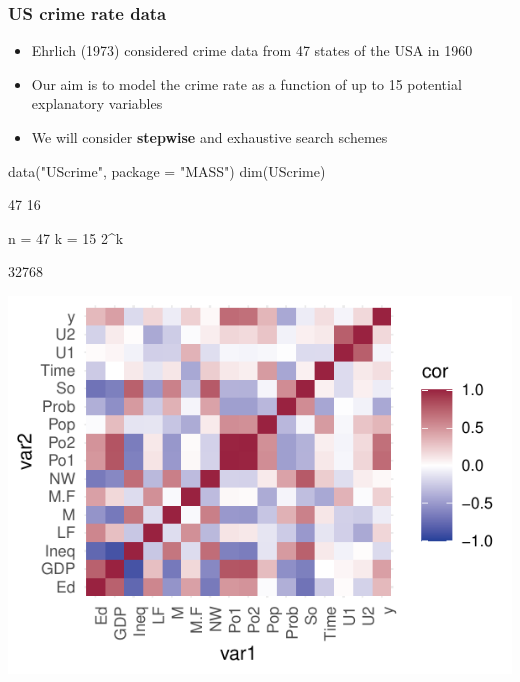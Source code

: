 \documentclass[a4paper]{article}\usepackage[]{graphicx}\usepackage[]{xcolor}
\makeatletter
\def\maxwidth{ %
  \ifdim\Gin@nat@width>\linewidth
    \linewidth
  \else
    \Gin@nat@width
  \fi
}
\makeatother
\begin{document}
\subsubsection{US crime rate data}
\begin{itemize}
	\item Ehrlich (1973) considered crime data from 47 states of the USA in 1960
	\item Our aim is to model the crime rate as a function of up to 15 potential explanatory variables
	\item We will consider \textcolor{myblue}{\textbf{stepwise}} and exhaustive search schemes
\end{itemize}
\begin{Schunk}
\begin{Sinput}
data("UScrime", package = "MASS")
dim(UScrime)
\end{Sinput}
\begin{Soutput}
[1] 47 16
\end{Soutput}
\begin{Sinput}
n = 47
k = 15
2^k
\end{Sinput}
\begin{Soutput}
[1] 32768
\end{Soutput}


{\centering \includegraphics[width=\maxwidth]{figure/listings-unnamed-chunk-386-1} 

}

\end{Schunk}
\end{document}
